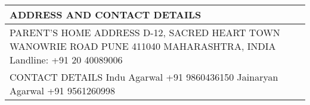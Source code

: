 \documentclass[a4paper,8pt]{extarticle}
\newcommand{\redfont}[1]{%
	{\color{textred}%
	\fontspec{Fjalla One}%
	\fontsize{14pt}{18pt}%
	\selectfont #1}}
\begin{document}
\bigskip
\begin{tabularx}{\linewidth}{X}
\large ADDRESS AND CONTACT DETAILS	\\\toprule
\redfont{PARENT'S HOME ADDRESS}\newline
D-12, SACRED HEART TOWN \newline
WANOWRIE ROAD \newline
PUNE 411040 \newline
MAHARASHTRA, INDIA \newline
Landline: +91 20 40089006 \\
\redfont{CONTACT DETAILS}\newline
Indu Agarwal \newline
+91 9860436150 \newline 
Jainaryan Agarwal \newline
+91 9561260998 \newline
\end{tabularx}\\
\end{document}
